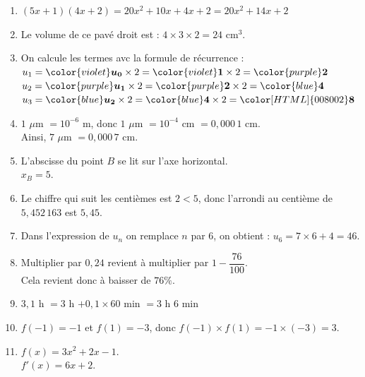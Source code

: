 \documentclass[a4paper,11pt,landscape,exos]{nsi} %
\begin{document}
\begin{multicols}{2}
\begin{enumerate}[itemsep=.75em]
\item $(5x+1)(4x+2)=20x^2+10x+4x+2=20x^2+14x+2$
\item Le volume de ce pavé droit est : $4\times 3\times 2=24$ cm$^3$.
\item On calcule les termes avc la formule de récurrence :\\ $u_{1} = {\color{violet}\boldsymbol{ u_{0}}} \times 2 =
                    {\color{violet}\boldsymbol{1}} \times 2 = {\color{purple}\boldsymbol{2}}$\\ $u_{2} = {\color{purple}\boldsymbol{ u_{1}}} \times 2 =
                    {\color{purple}\boldsymbol{2}} \times 2 = {\color{blue}\boldsymbol{4}}$\\ $u_{3} = {\color{blue}\boldsymbol{ u_{2}}} \times 2 =
                    {\color{blue}\boldsymbol{4}} \times 2 = {\color[HTML]{008002}\boldsymbol{8}}$
\item $1$ $\mu$m $=10^{-6}$ m, donc $1$ $\mu$m  $=10^{-4}$ cm  $=0{,}000\,1$ cm.\\
            Ainsi, $7$ $\mu$m $=0{,}000\,7$ cm.
\item L'abscisse du point $B$ se lit sur l'axe horizontal. \\
            $x_B=5$.
            
\item Le chiffre qui suit les centièmes est $2<5$, donc l'arrondi au centième de $5{,}452\,163$ est $5{,}45$.
\item Dans l'expression de $u_n$ on remplace $n$ par $6$, on obtient : $u_{6} =7 \times 6 +4=46$.
\item Multiplier par $0{,}24$ revient à multiplier par $1-\dfrac{76}{100}$. \\
          Cela revient donc à baisser de $76 \%$. 
\item $3{,}1$ h $ = 3$ h $ + 0{,}1 \times 60$ min $  = 3$ h $6$ min
\item $f(-1)=-1$ et $f(1)=-3$, donc $f(-1)\times f(1)=-1\times (-3)=3$.
\item $f(x)=3x^2+2x-1$.\\
          $f'(x)=6x+2$.
\end{enumerate}
\end{multicols}
\end{document}
